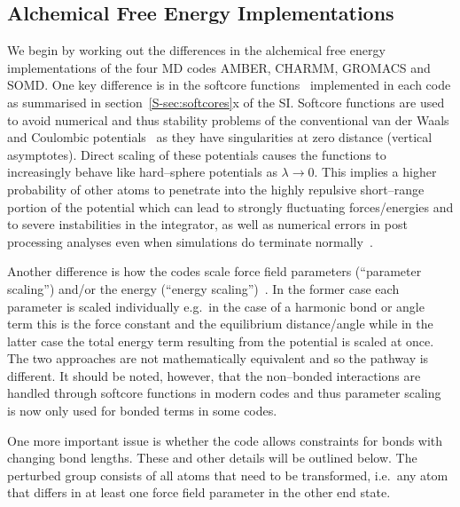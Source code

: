 \documentclass[journal=jctcce,manuscript=article]{achemso}
\begin{document}
\subsection{Alchemical Free Energy Implementations}
\label{sec:afe_impl}

We begin by working out the differences in the alchemical free energy
implementations of the four MD codes AMBER, CHARMM, GROMACS and
SOMD.  One key difference is in the softcore
functions~\cite{beutler_avoiding_1994, zacharias_separationshifted_1994} 
implemented in each code as summarised in section~\ref{S-sec:softcores}x of the 
SI.  Softcore functions are used to avoid numerical and thus
stability problems of the conventional van der Waals and Coulombic
potentials~\cite{steinbrecher_nonlinear_2007} as they have
singularities at zero distance (vertical asymptotes).  Direct scaling
of these potentials causes the functions to increasingly behave like
hard--sphere potentials as $\lambda\rightarrow 0$.  This implies a
higher probability of other atoms to penetrate into the highly
repulsive short--range portion of the potential which can lead to
strongly fluctuating forces/energies and to severe instabilities in
the integrator, as well as numerical errors in post processing analyses even when simulations do terminate normally~\cite{beutler_avoiding_1994, zacharias_separationshifted_1994, 
steinbrecher_nonlinear_2007}.

Another difference is how the codes scale force field parameters (``parameter 
scaling'') and/or the energy (``energy 
scaling'')~\cite{doi:10.1021/jp981628n}.  In the former case each parameter is 
scaled individually e.g.\ in the case of a harmonic bond or angle term
this is the force constant and the equilibrium distance/angle while in the 
latter case the total energy term resulting from the potential is scaled at 
once.  The two approaches are not mathematically equivalent and so the pathway 
is different.  It should be noted, however, that the non--bonded interactions 
are handled through softcore functions in modern codes and thus parameter 
scaling~\cite{doi:10.1021/j100056a020, JCROSS1986198} is now only used for 
bonded terms in some codes.

One more important issue is whether the code allows constraints for bonds with 
changing bond lengths.  These and other details will be outlined below.  The 
perturbed group consists of all atoms that need to be transformed, i.e.\ any 
atom that differs in at least one force field parameter in the other end
state.
\end{document}
